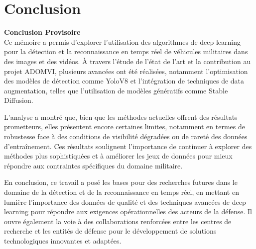 \chapter*{Conclusion}
\label{chap:conclusion}
\sloppy

\textbf{Conclusion Provisoire}\\


Ce mémoire a permis d'explorer l'utilisation des algorithmes de deep learning pour la détection et la reconnaissance en temps réel de véhicules militaires dans des images et des vidéos.
À travers l'étude de l'état de l'art et la contribution au projet ADOMVI, plusieurs avancées ont été réalisées, notamment l'optimisation des modèles de détection comme YoloV8 et l'intégration de techniques de data augmentation, telles que l'utilisation de modèles génératifs comme Stable Diffusion.

L'analyse a montré que, bien que les méthodes actuelles offrent des résultats prometteurs, elles présentent encore certaines limites, notamment en termes de robustesse face à des conditions de visibilité dégradées ou de rareté des données d'entraînement.
Ces résultats soulignent l'importance de continuer à explorer des méthodes plus sophistiquées et à améliorer les jeux de données pour mieux répondre aux contraintes spécifiques du domaine militaire.

En conclusion, ce travail a posé les bases pour des recherches futures dans le domaine de la détection et de la reconnaissance en temps réel, en mettant en lumière l'importance des données de qualité et des techniques avancées de deep learning pour répondre aux exigences opérationnelles des acteurs de la défense.
Il ouvre également la voie à des collaborations renforcées entre les centres de recherche et les entités de défense pour le développement de solutions technologiques innovantes et adaptées.

